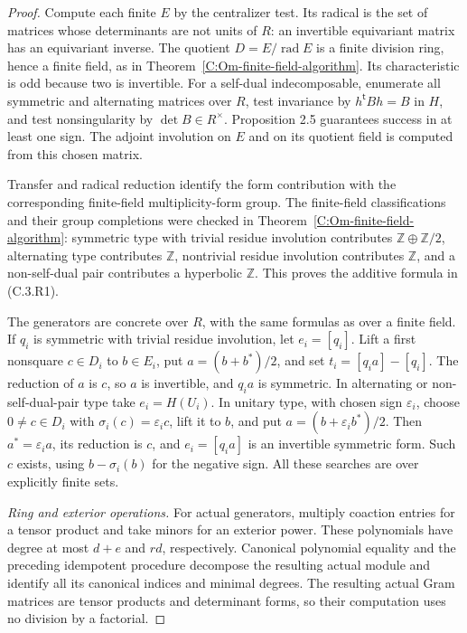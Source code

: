 \begin{proof}
Compute each finite $E$ by the centralizer test. Its radical is
the set of matrices whose determinants are not units of $R$:
an invertible equivariant matrix has an equivariant inverse.
The quotient $D=E/\operatorname{rad}E$ is a finite division
ring, hence a finite field, as in
Theorem~\ref{C:Om-finite-field-algorithm}. Its characteristic is
odd because two is invertible. For a self-dual indecomposable,
enumerate all symmetric and alternating matrices over $R$,
test invariance by
$h^{\mathsf t}Bh=B$ in $H$, and test nonsingularity by
$\det B\in R^\times$. Proposition 2.5 guarantees success in at
least one sign. The adjoint involution on $E$ and on its quotient
field is computed from this chosen matrix.

Transfer and radical reduction identify the form contribution
with the corresponding finite-field multiplicity-form group.
The finite-field classifications and their group completions
were checked in Theorem~\ref{C:Om-finite-field-algorithm}:
symmetric type with trivial residue involution contributes
$\mathbb Z\oplus\mathbb Z/2$, alternating type contributes
$\mathbb Z$, nontrivial residue involution contributes $\mathbb Z$,
and a non-self-dual pair contributes a hyperbolic $\mathbb Z$.
This proves the additive formula in (C.3.R1).

The generators are concrete over $R$, with the same formulas
as over a finite field. If $q_i$ is symmetric with trivial residue
involution, let $e_i=[q_i]$. Lift a first nonsquare $c\in D_i$
to $b\in E_i$, put $a=(b+b^*)/2$, and set
$t_i=[q_i a]-[q_i]$. The reduction of $a$ is $c$, so $a$ is
invertible, and $q_i a$ is symmetric. In alternating or
non-self-dual-pair type take $e_i=H(U_i)$. In unitary type,
with chosen sign $\varepsilon_i$, choose
$0\ne c\in D_i$ with $\sigma_i(c)=\varepsilon_i c$,
lift it to $b$, and put $a=(b+\varepsilon_i b^*)/2$.
Then $a^*=\varepsilon_i a$, its reduction is $c$, and
$e_i=[q_i a]$ is an invertible symmetric form. Such $c$
exists, using $b-\sigma_i(b)$ for the negative sign.
All these searches are over explicitly finite sets.

\emph{Ring and exterior operations.}
For actual generators, multiply coaction entries for a tensor
product and take minors for an exterior power. These polynomials
have degree at most $d+e$ and $rd$, respectively. Canonical
polynomial equality and the preceding idempotent procedure
decompose the resulting actual module and identify all its
canonical indices and minimal degrees. The resulting actual
Gram matrices are tensor products and determinant forms, so
their computation uses no division by a factorial.


\end{proof}
